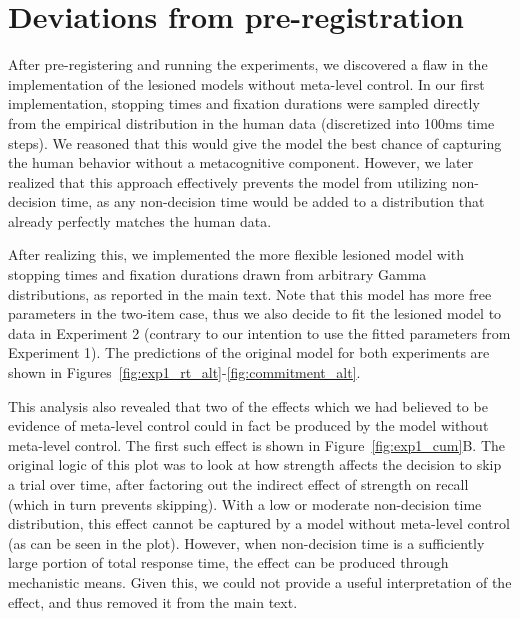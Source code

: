 

\section{Deviations from pre-registration}\label{app:deviation}

After pre-registering and running the experiments, we discovered a flaw in the implementation of the lesioned models without meta-level control. In our first implementation, stopping times and fixation durations were sampled directly from the empirical distribution in the human data (discretized into 100ms time steps). We reasoned that this would give the model the best chance of capturing the human behavior without a metacognitive component. However, we later realized that this approach effectively prevents the model from utilizing non-decision time, as any non-decision time would be added to a distribution that already perfectly matches the human data.

After realizing this, we implemented the more flexible lesioned model with stopping times and fixation durations drawn from arbitrary Gamma distributions, as reported in the main text. Note that this model has more free parameters in the two-item case, thus we also decide to fit the lesioned model to data in Experiment 2 (contrary to our intention to use the fitted parameters from Experiment 1). The predictions of the original model for both experiments are shown in Figures~\ref{fig:exp1_rt_alt}-\ref{fig:commitment_alt}.

This analysis also revealed that two of the effects which we had believed to be evidence of meta-level control could in fact be produced by the model without meta-level control. The first such effect is shown in Figure~\ref{fig:exp1_cum}B. The original logic of this plot was to look at how strength affects the decision to skip a trial over time, after factoring out the indirect effect of strength on recall (which in turn prevents skipping). With a low or moderate non-decision time distribution, this effect cannot be captured by a model without meta-level control (as can be seen in the plot). However, when non-decision time is a sufficiently large portion of total response time, the effect can be produced through mechanistic means. Given this, we could not provide a useful interpretation of the effect, and thus removed it from the main text.

